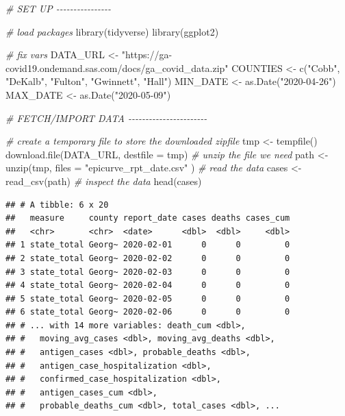 \documentclass[
  12pt,
]{style/krantz}
\newenvironment{Shaded}{\begin{snugshade}}{\end{snugshade}}
\newcommand{\AttributeTok}[1]{\textcolor[rgb]{0.77,0.63,0.00}{#1}}
\newcommand{\CommentTok}[1]{\textcolor[rgb]{0.56,0.35,0.01}{\textit{#1}}}
\newcommand{\FunctionTok}[1]{\textcolor[rgb]{0.00,0.00,0.00}{#1}}
\newcommand{\NormalTok}[1]{#1}
\newcommand{\OtherTok}[1]{\textcolor[rgb]{0.56,0.35,0.01}{#1}}
\newcommand{\StringTok}[1]{\textcolor[rgb]{0.31,0.60,0.02}{#1}}
\begin{document}
\begin{Shaded}
\begin{Highlighting}[]
\CommentTok{\# SET UP {-}{-}{-}{-}{-}{-}{-}{-}{-}{-}{-}{-}{-}{-}{-}{-}}

\CommentTok{\# load packages}
\FunctionTok{library}\NormalTok{(tidyverse)}
\FunctionTok{library}\NormalTok{(ggplot2)}

\CommentTok{\# fix vars}
\NormalTok{DATA\_URL }\OtherTok{\textless{}{-}} \StringTok{"https://ga{-}covid19.ondemand.sas.com/docs/ga\_covid\_data.zip"}
\NormalTok{COUNTIES }\OtherTok{\textless{}{-}} \FunctionTok{c}\NormalTok{(}\StringTok{"Cobb"}\NormalTok{, }\StringTok{"DeKalb"}\NormalTok{, }\StringTok{"Fulton"}\NormalTok{, }\StringTok{"Gwinnett"}\NormalTok{, }\StringTok{"Hall"}\NormalTok{)}
\NormalTok{MIN\_DATE }\OtherTok{\textless{}{-}} \FunctionTok{as.Date}\NormalTok{(}\StringTok{"2020{-}04{-}26"}\NormalTok{)}
\NormalTok{MAX\_DATE }\OtherTok{\textless{}{-}} \FunctionTok{as.Date}\NormalTok{(}\StringTok{"2020{-}05{-}09"}\NormalTok{)}


\CommentTok{\# FETCH/IMPORT DATA {-}{-}{-}{-}{-}{-}{-}{-}{-}{-}{-}{-}{-}{-}{-}{-}{-}{-}{-}{-}{-}{-}{-}}

\CommentTok{\# create a temporary file to store the downloaded zipfile}
\NormalTok{tmp }\OtherTok{\textless{}{-}} \FunctionTok{tempfile}\NormalTok{()}
\FunctionTok{download.file}\NormalTok{(DATA\_URL, }\AttributeTok{destfile =}\NormalTok{ tmp)}
\CommentTok{\# unzip the file we need}
\NormalTok{path }\OtherTok{\textless{}{-}} \FunctionTok{unzip}\NormalTok{(tmp, }\AttributeTok{files =} \StringTok{"epicurve\_rpt\_date.csv"}\NormalTok{ )}
\CommentTok{\# read the data}
\NormalTok{cases }\OtherTok{\textless{}{-}} \FunctionTok{read\_csv}\NormalTok{(path)}
\CommentTok{\# inspect the data}
\FunctionTok{head}\NormalTok{(cases)}
\end{Highlighting}
\end{Shaded}

\begin{verbatim}
## # A tibble: 6 x 20
##   measure     county report_date cases deaths cases_cum
##   <chr>       <chr>  <date>      <dbl>  <dbl>     <dbl>
## 1 state_total Georg~ 2020-02-01      0      0         0
## 2 state_total Georg~ 2020-02-02      0      0         0
## 3 state_total Georg~ 2020-02-03      0      0         0
## 4 state_total Georg~ 2020-02-04      0      0         0
## 5 state_total Georg~ 2020-02-05      0      0         0
## 6 state_total Georg~ 2020-02-06      0      0         0
## # ... with 14 more variables: death_cum <dbl>,
## #   moving_avg_cases <dbl>, moving_avg_deaths <dbl>,
## #   antigen_cases <dbl>, probable_deaths <dbl>,
## #   antigen_case_hospitalization <dbl>,
## #   confirmed_case_hospitalization <dbl>,
## #   antigen_cases_cum <dbl>,
## #   probable_deaths_cum <dbl>, total_cases <dbl>, ...
\end{verbatim}
\end{document}
